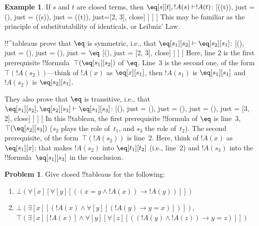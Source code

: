 \documentclass[10pt,a4paper]{article}
\theoremstyle{plain}
\theoremstyle{definition}
\newtheorem{ex}[thm]{Example}
\newtheorem{prob}{Problem}[section]
\theoremstyle{remark}
\newenvironment{oltableau}{}{}
\providecommand{\lif}{\mathbin{\rightarrow}}
\providecommand{\lforall}{\mathord{\forall}}
\providecommand{\lexists}{\mathord{\exists}}
\providecommand{\Proves}{\mathrel{\vdash}}
\providecommand{\sFmla}[2]{#1(#2)}
\providecommand{\formula}{\relax}
\providecommand{\True}{\top}
\providecommand{\False}{\bot}
\providecommand{\TAss}[1]{}
\providecommand{\TRule}[1]{}
\providecommand{\formula}[1]{#1}
\begin{document}
\begin{ex}
If $s$ and $t$ are closed terms, then $\eq[s][t], !A(s)
\Proves !A(t)$:
\begin{oltableau}
  [\sFmla{\False}{\formula{A}(t)}, just = \TAss
    [\sFmla{\True}{\eq[s][t]}, just = \TAss
      [\sFmla{\True}{\formula{A}(s)}, just = \TAss
        [\sFmla{\True}{\formula{A}(t)}, just={\TRule{\True}{\eq}[2, 3]}, close]
      ]
    ]
  ]
\end{oltableau}
This may be familiar as the principle of substitutability of
identicals, or Leibniz' Law.

!!^{tableau}s prove that $\eq$ is symmetric, i.e., that $\eq[s_1][s_2]
\Proves \eq[s_2][s_1]$:
\begin{oltableau}
  [\sFmla{\False}{\eq[s_2][s_1]}, just = \TAss
    [\sFmla{\True}{\eq[s_1][s_2]}, just = \TAss
      [\sFmla{\True}{\eq[s_1][s_1]}, just = {$\eq$}
        [\sFmla{\True}{\eq[s_2][s_1]}, just = {\TRule{\True}{\eq}[2, 3]}, close]
      ]
    ]
  ]
\end{oltableau}
Here, line $2$ is the first prerequisite
!!{formula}~$\sFmla{\True}{\eq[s_1][s_2]}$ of $\TRule{\True}{\eq}$.
Line~$3$ is the second one, of the form $\sFmla{\True}{!A(s_2)}$---think of
$!A(x)$ as
$\eq[x][s_1]$, then $!A(s_1)$ is $\eq[s_1][s_1]$ and $!A(s_2)$ is $\eq[s_2][s_1]$.

They also prove that $\eq$ is transitive, i.e., that $\eq[s_1][s_2],
\eq[s_2][s_3] \Proves \eq[s_1][s_3]$:
\begin{oltableau}
  [\sFmla{\False}{\eq[s_1][s_3]}, just = \TAss
    [\sFmla{\True}{\eq[s_1][s_2]}, just = \TAss
      [\sFmla{\True}{\eq[s_2][s_3]}, just = \TAss
        [\sFmla{\True}{\eq[s_1][s_3]}, just = {\TRule{\True}{\eq}[3, 2]}, close]
      ]
    ]
  ]
\end{oltableau}
In this !!{tableau}, the first prerequisite !!{formula} of
$\TRule{\True}{\eq}$ is line~$3$, $\sFmla{\True}{\eq[s_2][s_3]}$
($s_2$ plays the role of~$t_1$, and $s_3$ the role of~$t_2$). The
second prerequisite, of the form~$\sFmla{\True}{!A(s_2)}$ is line~$2$.
Here, think of $!A(x)$ as $\eq[s_1][x]$; that makes $!A(s_2)$ into
$\eq[t_1][t_2]$ (i.e., line~$2$) and $!A(s_3)$ into the
!!{formula}~$\eq[s_1][s_3]$ in the conclusion.
\end{ex}

\begin{prob}
Give closed !!{tableau}s for the following:
\begin{enumerate}
\item $\sFmla{\False}{\lforall[x][\lforall[y][((x = y \land !A(x))
      \lif !A(y))]]}$
\item $\sFmla{\False}{\lexists[x][(!A(x) \land
    \lforall[y][(!A(y) \lif y = x)])]}$,\\
  $\sFmla{\True}{\lexists[x][!A(x)] \land
    \lforall[y][\lforall[z][((!A(y) \land !A(z)) \lif y = z)]]}$
\end{enumerate}
\end{prob}
\end{document}
